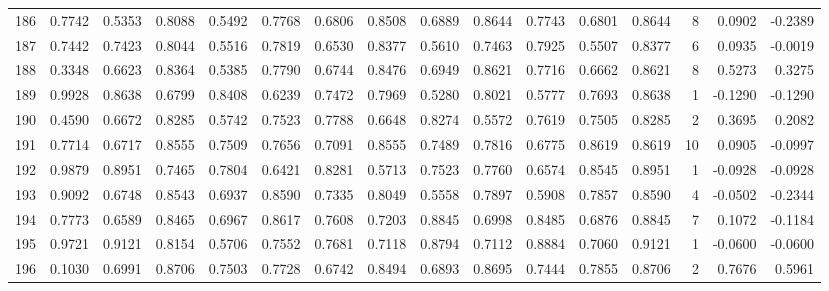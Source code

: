 \begin{tabular}{lrrrrrrrrrrrrrrr}
186 &      0.7742 &  0.5353 &  0.8088 &  0.5492 &  0.7768 &  0.6806 &  0.8508 &  0.6889 &  0.8644 &  0.7743 &   0.6801 &     0.8644 &      8 &                    0.0902 &                    -0.2389 \\
187 &      0.7442 &  0.7423 &  0.8044 &  0.5516 &  0.7819 &  0.6530 &  0.8377 &  0.5610 &  0.7463 &  0.7925 &   0.5507 &     0.8377 &      6 &                    0.0935 &                    -0.0019 \\
188 &      0.3348 &  0.6623 &  0.8364 &  0.5385 &  0.7790 &  0.6744 &  0.8476 &  0.6949 &  0.8621 &  0.7716 &   0.6662 &     0.8621 &      8 &                    0.5273 &                     0.3275 \\
189 &      0.9928 &  0.8638 &  0.6799 &  0.8408 &  0.6239 &  0.7472 &  0.7969 &  0.5280 &  0.8021 &  0.5777 &   0.7693 &     0.8638 &      1 &                   -0.1290 &                    -0.1290 \\
190 &      0.4590 &  0.6672 &  0.8285 &  0.5742 &  0.7523 &  0.7788 &  0.6648 &  0.8274 &  0.5572 &  0.7619 &   0.7505 &     0.8285 &      2 &                    0.3695 &                     0.2082 \\
191 &      0.7714 &  0.6717 &  0.8555 &  0.7509 &  0.7656 &  0.7091 &  0.8555 &  0.7489 &  0.7816 &  0.6775 &   0.8619 &     0.8619 &     10 &                    0.0905 &                    -0.0997 \\
192 &      0.9879 &  0.8951 &  0.7465 &  0.7804 &  0.6421 &  0.8281 &  0.5713 &  0.7523 &  0.7760 &  0.6574 &   0.8545 &     0.8951 &      1 &                   -0.0928 &                    -0.0928 \\
193 &      0.9092 &  0.6748 &  0.8543 &  0.6937 &  0.8590 &  0.7335 &  0.8049 &  0.5558 &  0.7897 &  0.5908 &   0.7857 &     0.8590 &      4 &                   -0.0502 &                    -0.2344 \\
194 &      0.7773 &  0.6589 &  0.8465 &  0.6967 &  0.8617 &  0.7608 &  0.7203 &  0.8845 &  0.6998 &  0.8485 &   0.6876 &     0.8845 &      7 &                    0.1072 &                    -0.1184 \\
195 &      0.9721 &  0.9121 &  0.8154 &  0.5706 &  0.7552 &  0.7681 &  0.7118 &  0.8794 &  0.7112 &  0.8884 &   0.7060 &     0.9121 &      1 &                   -0.0600 &                    -0.0600 \\
196 &      0.1030 &  0.6991 &  0.8706 &  0.7503 &  0.7728 &  0.6742 &  0.8494 &  0.6893 &  0.8695 &  0.7444 &   0.7855 &     0.8706 &      2 &                    0.7676 &                     0.5961 \\

\end{tabular}
